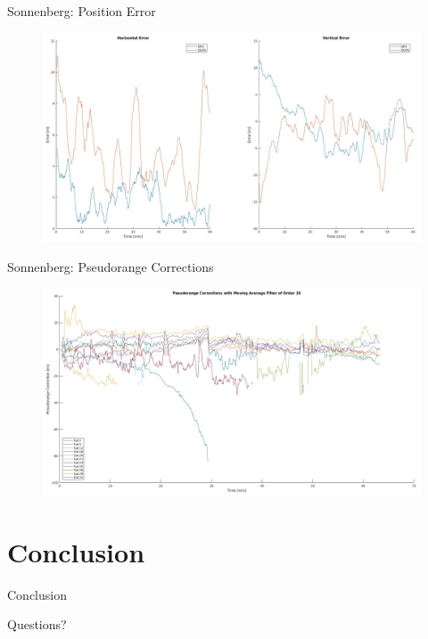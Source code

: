 \documentclass[12pt, compress, xcolor=table]{beamer}
\begin{document}
\begin{frame}{Sonnenberg: Position Error}
 \begin{figure}
  \centering
  \includegraphics[width=\textwidth]{images/Errors_Sonnenberg.png}
 \end{figure}
\end{frame}

\begin{frame}{Sonnenberg: Pseudorange Corrections}
 \begin{figure}
  \centering
  \includegraphics[width=\textwidth]{images/PRCs_Sonnenberg.png}
 \end{figure}
\end{frame}


\section{Conclusion}

\begin{frame}{Conclusion}
 
\end{frame}


\begin{frame}[standout]
 Questions?
\end{frame}
\end{document}

